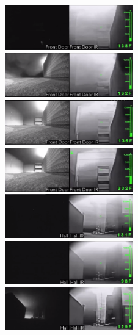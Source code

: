 \documentclass[12pt,oneside]{book}
\begin{document}
\begin{figure}[H]
\centering
\includegraphics[width=0.495\textwidth]{../0_Images/Tactical_Considerations/Thermal_Imager/Exp1FD_6min.png}
\includegraphics[width=0.495\textwidth]{../0_Images/Tactical_Considerations/Thermal_Imager/Exp1FD_9min.png}
\includegraphics[width=0.495\textwidth]{../0_Images/Tactical_Considerations/Thermal_Imager/Exp1FD_14min.png}
\includegraphics[width=0.495\textwidth]{../0_Images/Tactical_Considerations/Thermal_Imager/Exp1FD_22min.png}
\includegraphics[width=0.495\textwidth]{../0_Images/Tactical_Considerations/Thermal_Imager/Exp1Hall_6min.png}
\includegraphics[width=0.495\textwidth]{../0_Images/Tactical_Considerations/Thermal_Imager/Exp1Hall_9min.png}
\includegraphics[width=0.495\textwidth]{../0_Images/Tactical_Considerations/Thermal_Imager/Exp1Hall_14min.png}

\end{figure}
\end{document}
